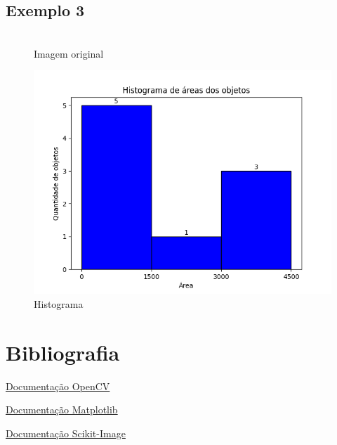 \documentclass[12pt, letterpaper]{article}
\begin{document}
    \subsection{Exemplo 3}
    \begin{figure}[H]
    \centering
    \begin{minipage}{.45\textwidth}
        \centering
        \\ {Imagem original}
    \end{minipage}
    \begin{minipage}{.5\textwidth}
        \centering
        {\includegraphics[width=1\linewidth]{processed/objetos3/histogram.png}}
        \\ {Histograma}
    \end{minipage}
    \end{figure}

\section{Bibliografia}
    \href{https://docs.opencv.org/3.1.0/}{Documentação OpenCV}
    
    \href{https://matplotlib.org/stable/index.html}{Documentação Matplotlib}
    
    \href{https://scikit-image.org/docs/stable/index.html}{Documentação Scikit-Image}
\end{document}
